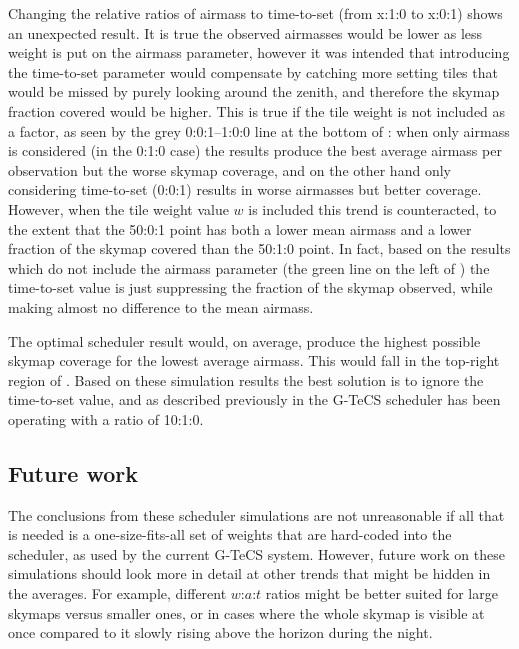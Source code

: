 \begin{colsection}
\begin{colsection}
Changing the relative ratios of airmass to time-to-set (from x:1:0 to x:0:1) shows an unexpected result. It is true the observed airmasses would be lower as less weight is put on the airmass parameter, however it was intended that introducing the time-to-set parameter would compensate by catching more setting tiles that would be missed by purely looking around the zenith, and therefore the skymap fraction covered would be higher. This is true if the tile weight is not included as a factor, as seen by the grey 0:0:1--1:0:0 line at the bottom of : when only airmass is considered (in the 0:1:0 case) the results produce the best average airmass per observation but the worse skymap coverage, and on the other hand only considering time-to-set (0:0:1) results in worse airmasses but better coverage. However, when the tile weight value $w$ is included this trend is counteracted, to the extent that the 50:0:1 point has both a lower mean airmass and a lower fraction of the skymap covered than the 50:1:0 point. In fact, based on the results which do not include the airmass parameter (the green line on the left of ) the time-to-set value is just suppressing the fraction of the skymap observed, while making almost no difference to the mean airmass.

The optimal scheduler result would, on average, produce the highest possible skymap coverage for the lowest average airmass. This would fall in the top-right region of . Based on these simulation results the best solution is to ignore the time-to-set value, and as described previously in  the G-TeCS scheduler has been operating with a ratio of 10:1:0.

\end{colsection}


\subsection{Future work}
\label{sec:scheduler_sim_future}
\begin{colsection}


The conclusions from these scheduler simulations are not unreasonable if all that is needed is a one-size-fits-all set of weights that are hard-coded into the scheduler, as used by the current G-TeCS system. However, future work on these simulations should look more in detail at other trends that might be hidden in the averages. For example, different $w$:$a$:$t$ ratios might be better suited for large skymaps versus smaller ones, or in cases where the whole skymap is visible at once compared to it slowly rising above the horizon during the night.


\end{colsection}
\end{colsection}
